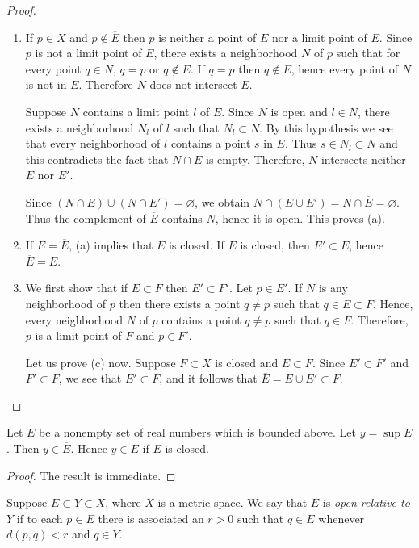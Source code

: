 \begin{proof}
    \,
\begin{enumerate}
\item[(a)] If $p \in X$ and $p \notin \overline{E}$ then $p$ is neither a point of $E$ nor a limit point of $E$.
Since $p$ is not a limit point of $E$, there exists a neighborhood $N$ of $p$ such that for every point $q \in N$, $q=p$ or $q \notin E$.
If $q=p$ then $q \notin E$, hence every point of $N$ is not in $E$. 
Therefore $N$ does not intersect $E$.

Suppose $N$ contains a limit point $l$ of $E$. Since $N$ is open and $l \in N$, there exists a neighborhood $N_l$ of $l$ such that $N_l \subset N$.
By this hypothesis we see that every neighborhood of $l$ contains a point $s$ in $E$.
Thus $s \in N_l \subset N$ and this contradicts the fact that $N\cap E$ is empty. 
Therefore, $N$ intersects neither $E$ nor $E'$.

Since $(N \cap E)\cup(N \cap E')=\varnothing$, we obtain $N \cap (E \cup E') = N \cap \overline{E} = \varnothing$. 
Thus the complement of $\overline{E}$ contains $N$, hence it is open. 
This proves (a).
\item[(b)] If $E=\overline{E}$, (a) implies that $E$ is closed. If $E$ is closed, then $E' \subset E$, hence $\overline{E}=E$.
\item[(c)] We first show that if $E \subset F$ then $E' \subset F'$.
Let $p \in E'$.
If $N$ is any neighborhood of $p$ then there exists a point $q \neq p$ such that $q \in E \subset F$.
Hence, every neighborhood $N$ of $p$ contains a point $q \neq p$ such that $q \in F$. 
Therefore, $p$ is a limit point of $F$ and $p \in F'$.

Let us prove (c) now. 
Suppose $F \subset X$ is closed and $E \subset F$. 
Since $E' \subset F'$ and $F' \subset F$, we see that $E' \subset F$, and it follows that $\overline{E}=E \cup E' \subset F$.
\end{enumerate}
\end{proof}
\begin{theorem} \label{thm:supremum_exist_in_closure}
    Let $E$ be a nonempty set of real numbers which is bounded above. 
    Let $y = \sup E$. 
    Then $y \in \overline{E}$.
    Hence $y \in E$ if $E$ is closed.
\end{theorem}
\begin{proof}
    The result is immediate.
\end{proof}
\begin{remark}
Suppose $E \subset Y \subset X$, where $X$ is a metric space. 
We say that $E$ is \emph{open relative to $Y$} if to each $p \in E$ there is associated an $r>0$ such that $q \in E$ whenever $d(p,q)<r$ and $q \in Y$.
\end{remark}

